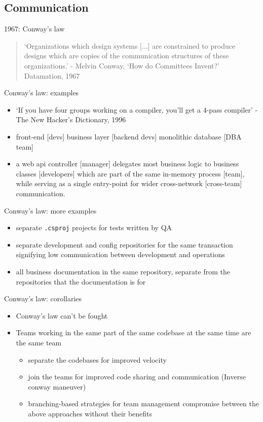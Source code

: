 \documentclass{beamer}
\begin{document}
	\subsection{Communication}
	\begin{frame}{1967: Conway's law}
		\begin{quote}
			`Organizations which design systems [...] are constrained to produce designs which are copies of the communication structures of these organizations.' - Melvin Conway, `How do Committees Invent?' Datamation, 1967
		\end{quote}
	\end{frame}
	\begin{frame}{Conway's law: examples}
		\begin{itemize}
			\item `If you have four groups working on a compiler, you'll get a 4-pass compiler' - The New Hacker's Dictionary, 1996\pause
			\item front-end [devs] business layer [backend devs] monolithic database [DBA team] \pause
			\item a web api controller [manager]  delegates most business logic to business classes [developers] which are part of the same in-memory process [team], while serving as a single entry-point for wider cross-network [cross-team] communication.
		\end{itemize}
	\end{frame}
	\begin{frame}{Conway's law: more examples}
		\begin{itemize}
			\item separate \texttt{.csproj} projects for tests written by QA \pause
			\item separate development and config repositories for the same transaction signifying low communication between development and operations \pause
			\item all business documentation in the same repository, separate from the repositories that the documentation is for \pause
		\end{itemize}
	\end{frame}
	\begin{frame}{Conway's law: corollaries}
		\begin{itemize}
			\item Conway's law can't be fought \pause
			\item Teams working in the same part of the same codebase at the same time are the same team \pause
			\begin{itemize}
				\item separate the codebases for improved velocity \pause
				\item join the teams for improved code sharing and communication (Inverse conway maneuver) \pause 
				\item branching-based strategies for team management compromise between the above approaches without their benefits
			\end{itemize}
		\end{itemize}
	\end{frame}
\end{document}
